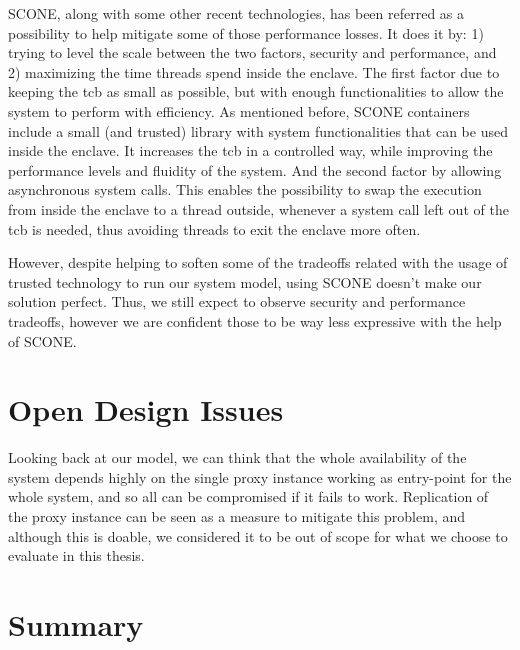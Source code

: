 SCONE, along with some other recent technologies, has been referred as a possibility to help mitigate some of those performance losses. 
It does it by: 
1) trying to level the scale between the two factors, security and performance, and
2) maximizing the time threads spend inside the enclave.
The first factor due to keeping the \gls{tcb} as small as possible, but with enough functionalities to allow the system to perform with efficiency. As mentioned before, SCONE containers include a small (and trusted) library with system functionalities that can be used inside the enclave. It increases the \gls{tcb} in a controlled way, while improving the performance levels and fluidity of the system.
And the second factor by allowing asynchronous system calls. This enables the possibility to swap the execution from inside the enclave to a thread outside, whenever a system call left out of the \gls{tcb} is needed, thus avoiding threads to exit the enclave more often.

However, despite helping to soften some of the tradeoffs related with the usage of trusted technology to run our system model, using SCONE doesn't make our solution perfect. Thus, we still expect to observe security and performance tradeoffs, however we are confident those to be way less expressive with the help of SCONE.

\section{Open Design Issues} %
\label{sec:design_openIssues}

Looking back at our model, we can think that the whole availability of the system depends highly on the single proxy instance working as entry-point for the whole system, and so all can be compromised if it fails to work. 
Replication of the proxy instance can be seen as a measure to mitigate this problem, and although this is doable, we considered it to be out of scope for what we choose to evaluate in this thesis. 



\section{Summary} %
\label{sec:sysModel_summary}

